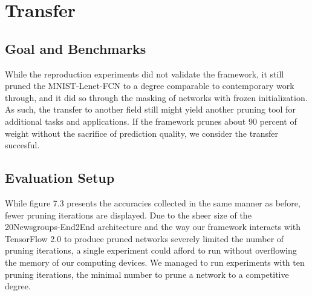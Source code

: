 
\section{Transfer}
\subsection*{Goal and Benchmarks}
While the reproduction experiments did not validate the framework, it still pruned the MNIST-Lenet-FCN to a degree comparable to contemporary work through, and it did so through the masking of networks with frozen initialization. As such, the transfer to another field still might yield another pruning tool for additional tasks and applications. If the framework prunes about 90 percent of weight without the sacrifice of prediction quality, we consider the transfer succesful.
\subsection*{Evaluation Setup}
While figure 7.3 presents the accuracies collected in the same manner as before, fewer pruning iterations are displayed. Due to the sheer size of the 20Newsgroups-End2End architecture and the way our framework interacts with TensorFlow 2.0 to produce pruned networks severely limited the number of pruning iterations, a single experiment could afford to run without overflowing the memory of our computing devices. We managed to run experiments with ten pruning iterations, the minimal number to prune a network to a competitive degree.
